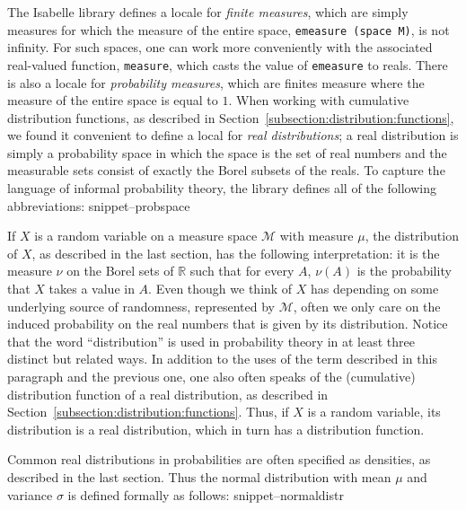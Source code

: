 \documentclass{svjour3}
\newcommand{\RR}{\mathbb{R}}
\newcommand{\mdl}[1]{{\mathcal #1}} %
\newcommand{\Snippet}[1]{\csname snippet--#1\endcsname}
\begin{document}
The Isabelle library defines a locale for \emph{finite measures}, which are simply measures for which the measure of the entire space, \texttt{emeasure (space M)}, is not infinity. For such spaces, one can work more conveniently with the associated real-valued function, \texttt{measure}, which casts the value of \texttt{emeasure} to reals. There is also a locale for \emph{probability measures}, which are finites measure where the measure of the entire space is equal to $1$. When working with cumulative distribution functions, as described in Section~\ref{subsection:distribution:functions}, we found it convenient to define a local for \emph{real distributions}; a real distribution is simply a probability space in which the space is the set of real numbers and the measurable sets consist of exactly the Borel subsets of the reals. To capture the language of informal probability theory, the library defines all of the following abbreviations:
\Snippet{probspace}

If $X$ is a random variable on a measure space $\mdl M$ with measure $\mu$, the distribution of $X$, as described in the last section, has the following interpretation: it is the measure $\nu$ on the Borel sets of $\RR$ such that for every $A$, $\nu(A)$ is the probability that $X$ takes a value in $A$. Even though we think of $X$ has depending on some underlying source of randomness, represented by $\mdl M$, often we only care on the induced probability on the real numbers that is given by its distribution. Notice that the word ``distribution'' is used in probability theory in at least three distinct but related ways. In addition to the uses of the term described in this paragraph and the previous one, one also often speaks of the (cumulative) distribution function of a real distribution, as described in Section~\ref{subsection:distribution:functions}. Thus, if $X$ is a random variable, its distribution is a real distribution, which in turn has a distribution function.

Common real distributions in probabilities are often specified as densities, as described in the last section. Thus the normal distribution with mean $\mu$ and variance $\sigma$ is defined formally as follows:
\Snippet{normaldistr}
\end{document}
